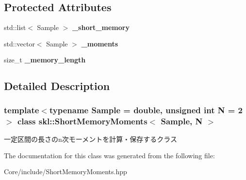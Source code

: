 \subsection*{Protected Attributes}
\begin{DoxyCompactItemize}
\item 
\hypertarget{classskl_1_1_short_memory_moments_a665bdcc39d02f026a3d4004e9125320b}{}\label{classskl_1_1_short_memory_moments_a665bdcc39d02f026a3d4004e9125320b} 
std\+::list$<$ Sample $>$ {\bfseries \+\_\+short\+\_\+memory}
\item 
\hypertarget{classskl_1_1_short_memory_moments_a3f30e699be2e68358aaad18a2cb02b10}{}\label{classskl_1_1_short_memory_moments_a3f30e699be2e68358aaad18a2cb02b10} 
std\+::vector$<$ Sample $>$ {\bfseries \+\_\+moments}
\item 
\hypertarget{classskl_1_1_short_memory_moments_a86cf2e73d37620bf7dce0a26c8212324}{}\label{classskl_1_1_short_memory_moments_a86cf2e73d37620bf7dce0a26c8212324} 
size\+\_\+t {\bfseries \+\_\+memory\+\_\+length}
\end{DoxyCompactItemize}


\subsection{Detailed Description}
\subsubsection*{template$<$typename Sample = double, unsigned int N = 2$>$\newline
class skl\+::\+Short\+Memory\+Moments$<$ Sample, N $>$}

一定区間の長さのn次モーメントを計算・保存するクラス 

The documentation for this class was generated from the following file\+:\begin{DoxyCompactItemize}
\item 
Core/include/Short\+Memory\+Moments.\+hpp\end{DoxyCompactItemize}
